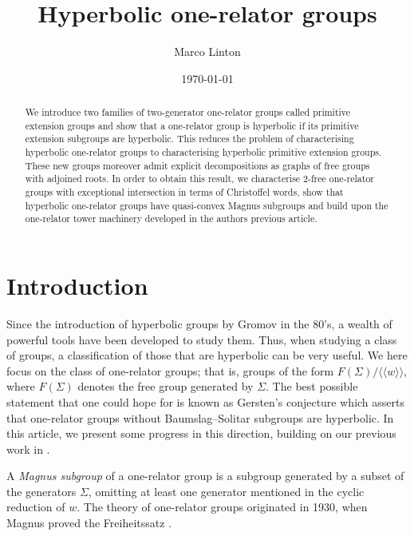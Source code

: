 \documentclass[11pt, a4paper]{amsart}
\theoremstyle{definition}
\newcommand{\normal}[1]{\langle\langle #1 \rangle\rangle}
\begin{document}
\title{Hyperbolic one-relator groups}
\author{Marco Linton}

\date{\today}

\address{University of Oxford, Oxford, OX2 6GG, UK}


\begin{abstract}
We introduce two families of two-generator one-relator groups called primitive extension groups and show that a one-relator group is hyperbolic if its primitive extension subgroups are hyperbolic. This reduces the problem of characterising hyperbolic one-relator groups to characterising hyperbolic primitive extension groups. These new groups moreover admit explicit decompositions as graphs of free groups with adjoined roots. In order to obtain this result, we characterise $2$-free one-relator groups with exceptional intersection in terms of Christoffel words, show that hyperbolic one-relator groups have quasi-convex Magnus subgroups and build upon the one-relator tower machinery developed in the authors previous article.
\end{abstract}


\maketitle

\section{Introduction}

Since the introduction of hyperbolic groups by Gromov in the 80's, a wealth of powerful tools have been developed to study them. Thus, when studying a class of groups, a classification of those that are hyperbolic can be very useful. We here focus on the class of one-relator groups; that is, groups of the form $F(\Sigma)/\normal{w}$, where $F(\Sigma)$ denotes the free group generated by $\Sigma$. The best possible statement that one could hope for is known as Gersten's conjecture \cite{gersten_92} which asserts that one-relator groups without Baumslag--Solitar subgroups are hyperbolic. In this article, we present some progress in this direction, building on our previous work in \cite{me_22}.

A \emph{Magnus subgroup} of a one-relator group is a subgroup generated by a subset of the generators $\Sigma$, omitting at least one generator mentioned in the cyclic reduction of $w$. The theory of one-relator groups originated in 1930, when Magnus proved the Freiheitssatz \cite{magnus_30}. 
\end{document}
